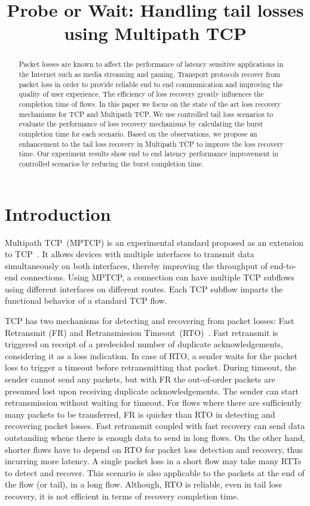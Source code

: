 \documentclass[10pt,conference,compsoc]{IEEEtran}
\title{Probe or Wait: Handling tail losses using Multipath TCP}
\author{\IEEEauthorblockN{Kiran~Yedugundla, Per~Hurtig, Anna~Brunstrom}
\IEEEauthorblockA{Dept. of Computer Science, Karlstad University, Karlstad, Sweden}}
\begin{document}
\maketitle

\begin{abstract}
Packet losses are known to affect the performance of latency sensitive applications in the Internet such as media streaming and gaming. Transport protocols recover from packet loss in order to provide reliable end to end communication and improving the quality of user experience. The efficiency of loss recovery greatly influences the completion time of flows. In this paper we focus on the state of the art loss recovery mechanisms for TCP and Multipath TCP. We use controlled tail loss scenarios to evaluate the performance of loss recovery mechanisms by calculating the burst completion time for each scenario. Based on the observations, we propose an enhancement to the tail loss recovery in Multipath TCP to improve the loss recovery time. Our experiment results show end to end latency performance improvement in controlled scenarios by reducing the burst completion time. 
\end{abstract}

\section{Introduction}


Multipath TCP~(MPTCP) is an experimental standard proposed as an extension to TCP~\cite{rfc6824}. It allows devices with multiple interfaces to transmit data simultaneously on both interfaces, thereby improving the throughput of end-to-end connections. Using MPTCP, a connection can have multiple TCP subflows using different interfaces on different routes. Each TCP subflow imparts the functional behavior of a standard TCP flow. 

TCP has two mechanisms for detecting and recovering from packet losses: Fast Retransmit (FR) and Retransmission Timeout~(RTO)~\cite{Flach:2013}. Fast retransmit is triggered on receipt of a predecided number of duplicate acknowledgements, considering it as a loss indication. In case of RTO, a sender waits for the packet loss to trigger a timeout before retransmitting that packet. During timeout, the sender cannot send any packets, but with FR the out-of-order packets are presumed lost upon receiving duplicate acknowledgements. The sender can start retransmission without waiting for timeout. For flows where there are sufficiently many packets to be transferred, FR is quicker than RTO in detecting and recovering packet losses. Fast retransmit coupled with fast recovery can send data outstanding whene there is enough data to send in long flows. On the other hand, shorter flows have to depend on RTO for packet loss detection and recovery, thus incurring more latency. A single packet loss in a short flow may take many RTTs to detect and recover. This scenario is also applicable to the packets at the end of the flow (or tail), in a long flow. Although, RTO is reliable, even in tail loss recovery, it is not efficient in terms of recovery completion time. 
\end{document}
